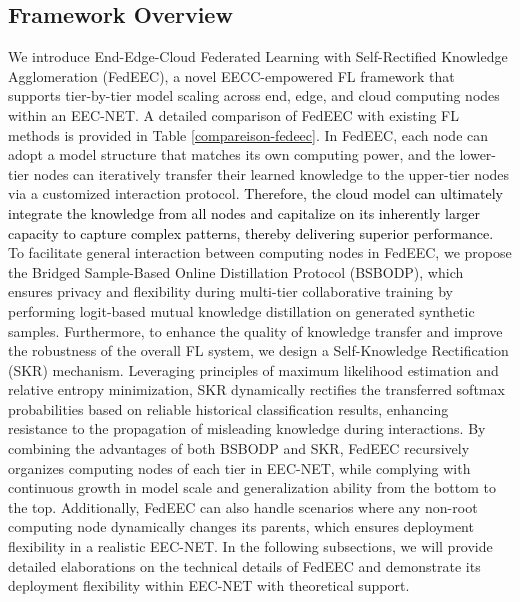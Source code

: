 \documentclass[10pt,journal]{IEEEtran}
\begin{document}
\subsection{Framework Overview}
We introduce End-Edge-Cloud Federated Learning with Self-Rectified Knowledge Agglomeration (FedEEC), a novel EECC-empowered FL framework that supports tier-by-tier model scaling across end, edge, and cloud computing nodes within an EEC-NET. A detailed comparison of FedEEC with existing FL methods is provided in Table \ref{compareison-fedeec}. In FedEEC, each node can adopt a model structure that matches its own computing power, and the lower-tier nodes can iteratively transfer their learned knowledge to the upper-tier nodes via a customized interaction protocol. \textcolor{black}{Therefore, the cloud model can ultimately integrate the knowledge from all nodes and capitalize on its inherently larger capacity to capture complex patterns, thereby delivering superior performance.} To facilitate general interaction between computing nodes in FedEEC, we propose the Bridged Sample-Based Online Distillation Protocol (BSBODP), which ensures privacy and flexibility during multi-tier collaborative training by performing logit-based mutual knowledge distillation on generated synthetic samples. Furthermore, to enhance the quality of knowledge transfer and improve the robustness of the overall FL system, we design a Self-Knowledge Rectification (SKR) mechanism. Leveraging principles of maximum likelihood estimation and relative entropy minimization, SKR dynamically rectifies the transferred softmax probabilities based on reliable historical classification results, enhancing resistance to the propagation of misleading knowledge during interactions. By combining the advantages of both BSBODP and SKR, FedEEC recursively organizes computing nodes of each tier in EEC-NET, while complying with continuous growth in model scale and generalization ability from the bottom to the top. Additionally, FedEEC can also handle scenarios where any non-root computing node dynamically changes its
parents, which ensures deployment flexibility in a realistic EEC-NET. In the following subsections, we will provide detailed elaborations on the technical details of FedEEC and demonstrate its deployment flexibility within EEC-NET with theoretical support.
\end{document}
